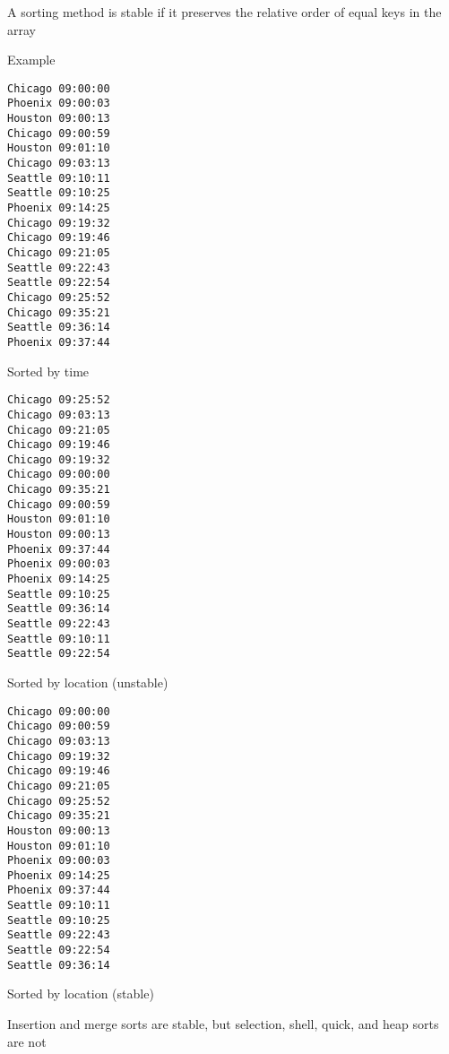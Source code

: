 \documentclass[8pt,a4paper,compress]{beamer}
\begin{document}
\begin{frame}[fragile]
\pause

A sorting method is stable if it preserves the relative order of equal keys in the array

\pause
\bigskip

Example

\smallskip

\begin{minipage}{65pt}
\begin{lstlisting}[language={},backgroundcolor=\color{white},style=focusin]
Chicago 09:00:00
Phoenix 09:00:03
Houston 09:00:13
Chicago 09:00:59
Houston 09:01:10
Chicago 09:03:13
Seattle 09:10:11
Seattle 09:10:25
Phoenix 09:14:25
Chicago 09:19:32
Chicago 09:19:46
Chicago 09:21:05
Seattle 09:22:43
Seattle 09:22:54
Chicago 09:25:52
Chicago 09:35:21
Seattle 09:36:14
Phoenix 09:37:44
\end{lstlisting}
\begin{center}

\smallskip

\tiny Sorted by time
\end{center}
\end{minipage}\hfill
\begin{minipage}{65pt}
\begin{lstlisting}[language={},backgroundcolor=\color{white},style=focusin]
Chicago 09:25:52
Chicago 09:03:13
Chicago 09:21:05
Chicago 09:19:46
Chicago 09:19:32
Chicago 09:00:00
Chicago 09:35:21
Chicago 09:00:59
Houston 09:01:10
Houston 09:00:13
Phoenix 09:37:44
Phoenix 09:00:03
Phoenix 09:14:25
Seattle 09:10:25
Seattle 09:36:14
Seattle 09:22:43
Seattle 09:10:11
Seattle 09:22:54
\end{lstlisting}
\begin{center}

\smallskip

\tiny Sorted by location (unstable)
\end{center}
\end{minipage}\hfill
\begin{minipage}{65pt}
\begin{lstlisting}[language={},backgroundcolor=\color{white},style=focusin]
Chicago 09:00:00
Chicago 09:00:59
Chicago 09:03:13
Chicago 09:19:32
Chicago 09:19:46
Chicago 09:21:05
Chicago 09:25:52
Chicago 09:35:21
Houston 09:00:13
Houston 09:01:10
Phoenix 09:00:03
Phoenix 09:14:25
Phoenix 09:37:44
Seattle 09:10:11
Seattle 09:10:25
Seattle 09:22:43
Seattle 09:22:54
Seattle 09:36:14
\end{lstlisting}
\begin{center}

\smallskip

\tiny Sorted by location (stable)

\end{center}
\end{minipage}

\pause
\bigskip

Insertion and merge sorts are stable, but selection, shell, quick, and heap sorts are not
\end{frame}
\end{document}
